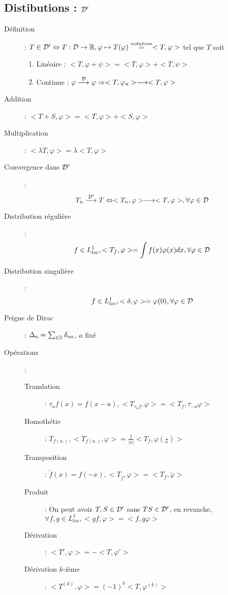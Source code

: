 \subsection{Distibutions : $\mathcal{D}'$}
\begin{description}
\item[Définition] : $T\in\mathcal{D}'\Leftrightarrow T:\mathcal{D}\rightarrow\mathbb{R},\varphi\mapsto T(\varphi)\overset{notation}{=}<T,\varphi>$ tel que $T$ soit
    \begin{enumerate}
        \item Linéaire : $<T,\varphi+\psi>=<T,\varphi>+<T,\psi>$
        \item Continue : $\varphi\overset{\mathcal{D}}{\longrightarrow}\varphi
        \Rightarrow
        <T,\varphi_n>\longrightarrow <T,\varphi>$
    \end{enumerate}
\item[Addition] : $<T+S, \varphi>=<T,\varphi>+<S,\varphi>$
\item[Multiplication] : $<\lambda T,\varphi>=\lambda<T,\varphi>$
\item[Convergence dans $\mathcal{D}'$] :
    \[
        T_n\overset{\mathcal{D}'}{\longrightarrow}T
        \Leftrightarrow
        <T_n,\varphi>\longrightarrow<T,\varphi>,\forall\varphi\in\mathcal{D}
    \]
\item[Distribution régulière] :
    \[
        f\in L^1_{loc}, <T_f,\varphi>=\int f(x)\varphi(x)dx,\forall\varphi\in\mathcal{D}
    \]
\item[Distribution singulière] :
    \[
        f\in L^1_{loc}, <\delta, \varphi>=\varphi(0),\forall\varphi\in\mathcal{D}
    \]
\item[Peigne de Dirac] : $\Delta_a=\sum_{\in\mathbb{Z}}\delta_{na}$, $a$ fixé
\item[Opérations] :
\begin{description}
    \item[Translation] : $\tau_{a}f(x)=f(x-a), <T_{\tau_af},\varphi>=<T_f,\tau_{-a}\varphi>$
    \item[Homothétie] : $T_{f(a.)}, <T_{f(a.)},\varphi>=\frac{1}{|a|}<T_f,\varphi\left(\frac{.}{a}\right)>$
    \item[Transposition] : $\check f(x)=f(-x), <T_{\check f},\varphi>=<T_f,\check\varphi>$
    \item[Produit] : On peut avoir $T,S\in\mathcal{D}'$ sans $TS\in\mathcal{D}'$, en revanche,\\
        $\forall f,g\in L^1_{loc}, <gf,\varphi>=<f,g\varphi>$
    \item[Dérivation] : $<T',\varphi>=-<T,\varphi'>$
    \item[Dérivation $k$-ième] : $<T^{(k)},\varphi>=(-1)^k<T,\varphi^{(k)}>$

\end{description}
\end{description}
